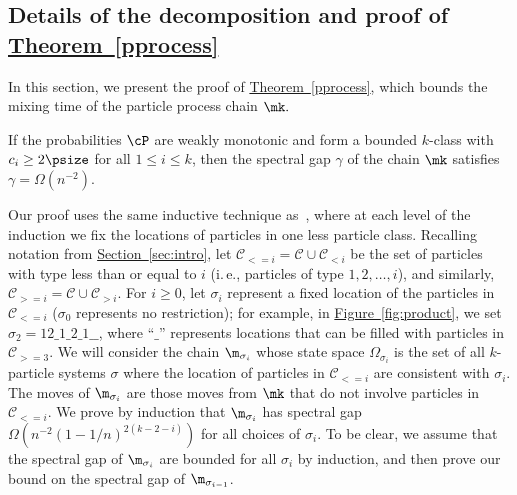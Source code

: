 \documentclass[11pt]{article}
\providecommand{\ie}{i.\,e.}
\providecommand{\expref}[2]{\texorpdfstring{\hyperref[#2]{#1~\ref{#2}}}{#1~\ref{#2}}}
\begin{document}
%
%
\subsection{Details of the decomposition and proof of \expref{Theorem}{pprocess}}
\label{sec:mk}

In this section, we present the proof of \expref{Theorem}{pprocess}, which bounds 
the mixing time of the particle process chain $\mk.$  

\begin{thm:mk}
If the probabilities $\cP$ are weakly monotonic and form a bounded 
$k$-class with  $c_i\geq 2\psize$ for all $1\leq i \leq k$, 
then the spectral gap $\gamma$ of the chain $\mk$ satisfies
\abovedisplayskip=3pt
\belowdisplayskip=3pt
$\gamma =\Omega(n^{-2}).$
\end{thm:mk}


Our proof uses the same inductive technique
as~\cite{MS}, where at each level of the induction we fix the
locations of particles in one less particle class.  
Recalling notation from \expref{Section}{sec:intro}, 
let $\mathcal{C}_{<= i} = \mathcal{C} \cup \mathcal{C}_{< i}$ 
be the set of particles with type less than or 
equal to $i$ (\ie,  particles of type $1, 2, \ldots, i$), and similarly,
$\mathcal{C}_{>= i} = \mathcal{C} \cup \mathcal{C}_{> i}$.  For $i\geq 0$, 
let $\sigma_i$ represent a fixed location of 
the particles in $\mathcal{C}_{<= i}$ ($\sigma_0$ represents 
no restriction); for example, in \expref{Figure}{fig:product}, we set 
$\sigma_{2} = 12\_1\_2\_1\_\_$, where ``$\_$'' represents  
locations that can be filled with particles in $\mathcal{C}_{>= 3}$. 
We will consider the chain $\m_{\sigma_{i}}$ whose state space 
$\Omega_{\sigma_i}$ is the set of all $k$-particle systems  $\sigma$ 
where the location of particles in $\mathcal{C}_{<= i}$ 
 are consistent with $\sigma_i$. 
The moves of $\m_{\sigma_{i}}$ are those moves from $\mk$ that 
do not involve particles in $\mathcal{C}_{<= i}$.
We prove by induction that 
$\m_{\sigma_{i}}$ has spectral gap $\Omega(n^{-2}(1-1/n)^{2(k-2-i)})$ 
for all choices of $\sigma_i$. To be clear, we assume that the spectral gap of
$\m_{\sigma_{i}}$ are bounded for all $\sigma_i$ by induction, and then 
prove our bound on the spectral gap of $\m_{\sigma_{i-1}}$.
\end{document}
